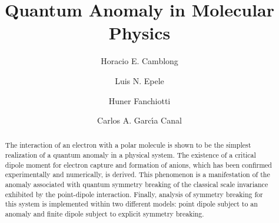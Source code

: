 \documentclass[a4paper,twocolumn,
showpacs,amssymb,aps,prl,superscriptaddress]{revtex4}%
\begin{document}
\title{Quantum Anomaly in Molecular Physics}


\author{Horacio E. Camblong}


\author{Luis N. Epele}

\author{Huner Fanchiotti}

 \author{Carlos A. Garc\'{\i}a Canal}


\begin{abstract}
The interaction of an electron with a polar molecule is shown to
be the simplest realization of a quantum anomaly in a physical
system. The existence of a critical dipole moment
for electron capture and formation of anions, which has been
confirmed experimentally and numerically, is derived. This
phenomenon is a manifestation of the anomaly associated with quantum symmetry
breaking of the classical scale invariance exhibited by the
point-dipole interaction. Finally, analysis of symmetry breaking for this
system is implemented within two different models: point dipole
subject to an anomaly and finite dipole subject to explicit
symmetry breaking. 
\end{abstract}



\maketitle

\end{document}
